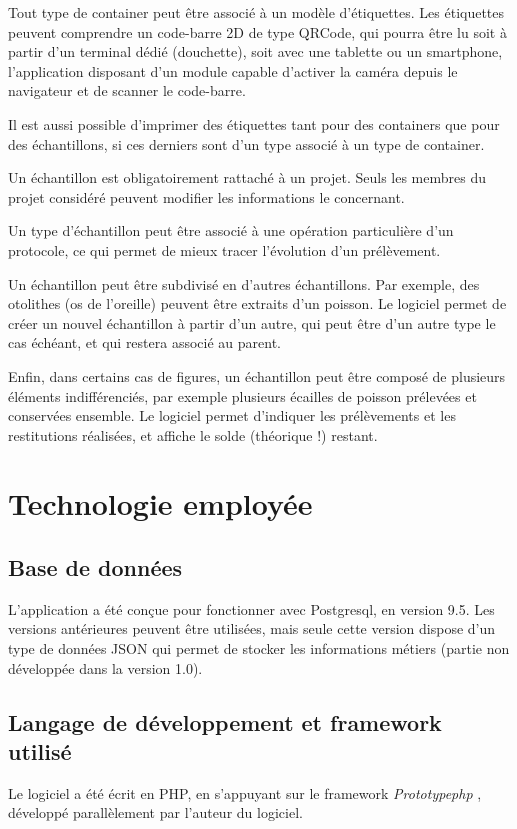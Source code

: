 Tout type de container peut être associé à un modèle d'étiquettes. Les étiquettes peuvent comprendre un code-barre 2D de type QRCode, qui pourra être lu soit à partir d'un terminal dédié (douchette), soit avec une tablette ou un smartphone, l'application disposant d'un module capable d'activer la caméra depuis le navigateur et de scanner le code-barre.

Il est aussi possible d'imprimer des étiquettes tant pour des containers que pour des échantillons, si ces derniers sont d'un type associé à un type de container.

Un échantillon est obligatoirement rattaché à un projet. Seuls les membres du projet considéré peuvent modifier les informations le concernant. 

Un type d'échantillon peut être associé à une opération particulière d'un protocole, ce qui permet de mieux tracer l'évolution d'un prélèvement.

Un échantillon peut être subdivisé en d'autres échantillons. Par exemple, des otolithes (os de l'oreille) peuvent être extraits d'un poisson. Le logiciel permet de créer un nouvel échantillon à partir d'un autre, qui peut être d'un autre type le cas échéant, et qui restera associé au parent. 

Enfin, dans certains cas de figures, un échantillon peut être composé de plusieurs éléments indifférenciés, par exemple plusieurs écailles de poisson prélevées et conservées ensemble. Le logiciel permet d'indiquer les prélèvements et les restitutions réalisées, et affiche le solde (théorique !) restant.

\section{Technologie employée}
\subsection{Base de données}

L'application a été conçue pour fonctionner avec Postgresql, en version 9.5. Les versions antérieures peuvent être utilisées, mais seule cette version dispose d'un type de données JSON qui permet de stocker les informations métiers (partie non  développée dans la version 1.0).

\subsection{Langage de développement et framework utilisé}
Le logiciel a été écrit en PHP, en s'appuyant sur le framework \textit{Prototypephp} \cite{prototypephp}, développé parallèlement par l'auteur du logiciel.

